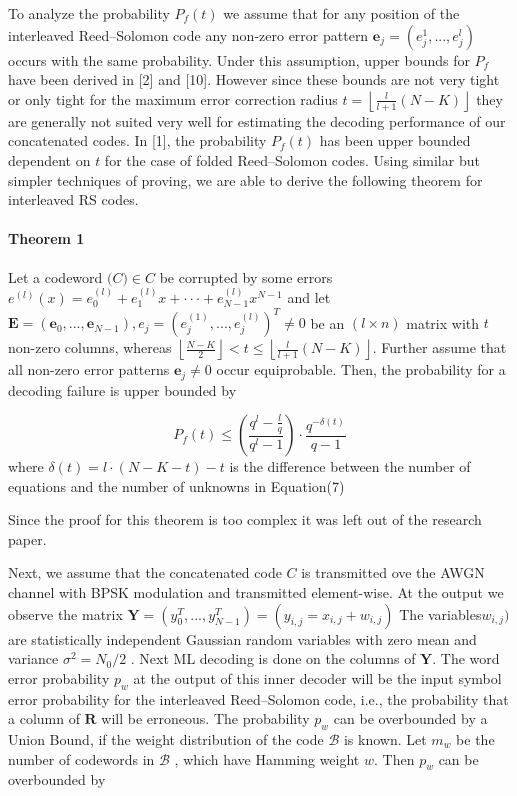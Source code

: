 \documentclass[fontsize=12pt]{article}
\begin{document}
To analyze the probability  $P_f(t)$ we
assume that for any position of the interleaved Reed–Solomon
code any non-zero error pattern $\mathbf{e}_j = (e_j^{1},...,e_j^{l})$ occurs with the same probability. Under this assumption, upper
bounds for $P_f$ have been derived in [2] and [10]. However
since these bounds are not very tight or only tight for the
maximum error correction radius  $t =  \left \lfloor \frac{l}{l+1} ({N - K}) \right \rfloor$ they are generally not suited very well for estimating the decoding
performance of our concatenated codes.
In [1], the probability $P_f(t)$ has been upper bounded dependent on $t$ for the case
of folded Reed–Solomon codes. Using similar but simpler techniques of proving, we are able to derive the following theorem for interleaved RS codes.
\paragraph{Theorem 1}
Let a codeword $\mathbf(C)\in C$ be corrupted by some
errors $e^{(l)}(x)=e^{(l)}_0+e^{(l)}_1x+\cdot\cdot\cdot+e^{(l)}_{N-1}x^{N-1}$ and let $\mathbf{E}=(\mathbf{e}_0,...,\mathbf{e}_{N-1}), e_j =(e^{(1)}_{j},...,e^{(l)}_{j})^T \neq 0$ be an $(l \times n)$ matrix with $t$ non-zero columns, whereas $ \left \lfloor \frac{N-K}{2} \right \rfloor < t \leq  \left \lfloor \frac{l}{l+1} ({N - K}) \right \rfloor$. Further assume that all non-zero error
patterns 	$\mathbf{e}_j \neq 0 $ occur equiprobable. Then, the probability for
a decoding failure is upper bounded by

$$ P_f(t) \leq (\frac{q^l -\frac{l}{q}}{q^l-1}) \cdot \frac{q^{-\delta(t)}}{q-1} $$
where $\delta(t) = l \cdot (N -K - t) -t$ is the difference between the number of equations and the number of unknowns in Equation(7)

Since the proof for this theorem is too complex it was left out of the research paper.

Next, we assume that the concatenated code $C$  is transmitted ove the AWGN channel
 with BPSK modulation and transmitted element-wise. At the output we observe the matrix $\mathbf{Y}=(y_0^T,...,y_{N-1}^T) = (y_{i,j}= x_{i,j}+w_{i,j})$ 
 The
variables$w_{i,j})$ are statistically independent Gaussian random
variables with zero mean and variance $\sigma^2=N_0/2$
. Next ML decoding is done on the columns of $\mathbf{Y}$. The word error probability $p_w$ at the output of
this inner decoder will be the input symbol error probability
for the interleaved Reed–Solomon code, i.e., the probability
that a column of $\mathbf{R}$ will be erroneous. The probability $p_w$ can
be overbounded by a Union Bound, if the weight distribution
of the code $\mathcal{B}$ is known. Let $m_w$ be the number of codewords
in $\mathcal{B}$
, which have Hamming weight $w$. Then $p_w$ can be
overbounded by
\end{document}
